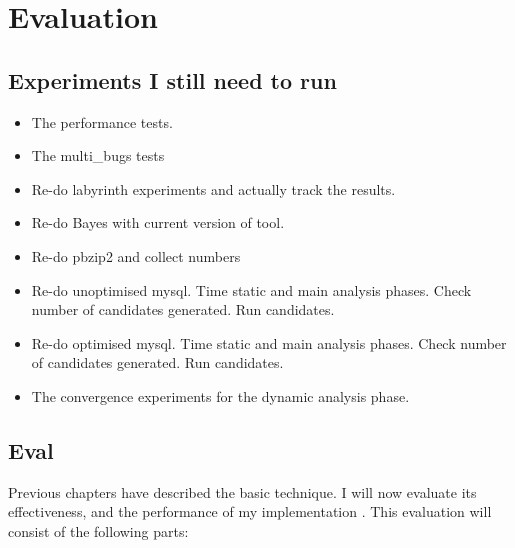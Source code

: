\chapter{Evaluation}
\label{chapter:eval}

\section{Experiments I still need to run}

\begin{itemize}
\item The performance tests.
\item The multi\_bugs tests
\item Re-do labyrinth experiments and actually track the results.
\item Re-do Bayes with current version of tool.
\item Re-do pbzip2 and collect numbers
\item Re-do unoptimised mysql.  Time static and main analysis phases.
  Check number of candidates generated.  Run candidates.
\item Re-do optimised mysql.  Time static and main analysis phases.
  Check number of candidates generated.  Run candidates.
\item The convergence experiments for the dynamic analysis phase.
\end{itemize}

\section{Eval}

Previous chapters have described the basic {\technique} technique.  I
will now evaluate its effectiveness, and the performance of my
implementation {\implementation}.  This evaluation will consist of the
following parts:

